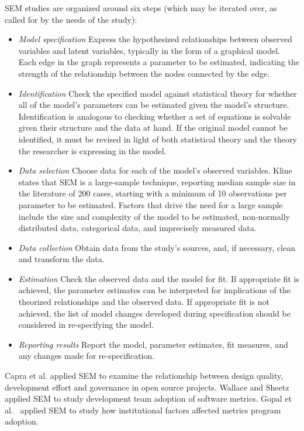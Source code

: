 SEM studies are organized around six steps (which may be iterated over, as called for by the needs of the study): 
\begin{itemize}
\item \textit{Model specification} Express the hypothesized relationships between observed variables and latent variables, typically in the form of a graphical model. Each edge in the graph represents a parameter to be estimated, indicating the strength of the relationship between the nodes connected by the edge.

\item \textit{Identification} 
Check the specified model against statistical theory for whether all of the model’s parameters can be estimated given the model's structure. Identification is analogous to checking whether a set of equations is solvable given their structure and the data at hand. If the original model cannot be identified, it must be revised in light of both statistical theory and the theory the researcher is expressing in the model.

\item \textit{Data selection}
Choose data for each of the model’s observed variables. Kline ~\cite{kline2015principles} states that SEM is a large-sample technique, reporting median sample size in the literature of 200 cases, starting with a minimum of 10 observations per parameter to be estimated.  Factors that drive the need for a large sample include the size and complexity of the model to be estimated, non-normally distributed data, categorical data, and imprecisely measured data.

\item \textit{Data collection}
Obtain data from the study's sources, and, if necessary, clean and transform the data.

\item \textit{Estimation}
Check the observed data and the model for fit.  If appropriate fit is achieved, the parameter estimates can be interpreted for implications of the theorized relationships and the observed data. If appropriate fit is not achieved, the list of model changes developed during specification should be considered in re-specifying the model.

\item \textit{Reporting results}
Report the model, parameter estimates,  fit measures, and any changes made for re-specification.
\end{itemize}

Capra et al. applied SEM to examine the relationship between design quality, development effort and governance in open source projects. Wallace and Sheetz~\cite{wallace2014adoption} applied SEM to study development team adoption of software metrics. Gopal et al.~\cite{gopal2005impact} applied SEM to study how institutional factors affected metrics program adoption.

